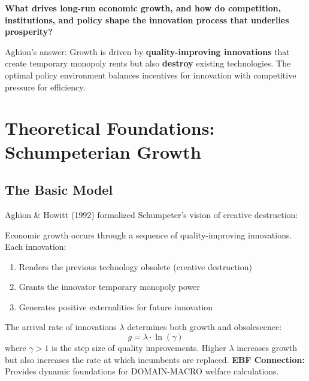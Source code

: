 \begin{tcolorbox}[colback=red!5!white, colframe=red!75!black, title=Central Question]
\textbf{What drives long-run economic growth, and how do competition, institutions, and policy shape the innovation process that underlies prosperity?}
\end{tcolorbox}

Aghion's answer: Growth is driven by \textbf{quality-improving innovations} that create temporary monopoly rents but also \textbf{destroy} existing technologies. The optimal policy environment balances incentives for innovation with competitive pressure for efficiency.

\section{Theoretical Foundations: Schumpeterian Growth}

\subsection{The Basic Model}

Aghion \& Howitt (1992) formalized Schumpeter's vision of creative destruction:

\begin{definition}
Economic growth occurs through a sequence of quality-improving innovations. Each innovation:
\begin{enumerate}
    \item Renders the previous technology obsolete (creative destruction)
    \item Grants the innovator temporary monopoly power
    \item Generates positive externalities for future innovation
\end{enumerate}
\end{definition}

\begin{axiom}
\label{ax:pa1}
The arrival rate of innovations $\lambda$ determines both growth and obsolescence:
\begin{equation}
g = \lambda \cdot \ln(\gamma)
\end{equation}
where $\gamma > 1$ is the step size of quality improvements. Higher $\lambda$ increases growth but also increases the rate at which incumbents are replaced.
\textbf{EBF Connection:} Provides dynamic foundations for DOMAIN-MACRO welfare calculations.
\end{axiom}

